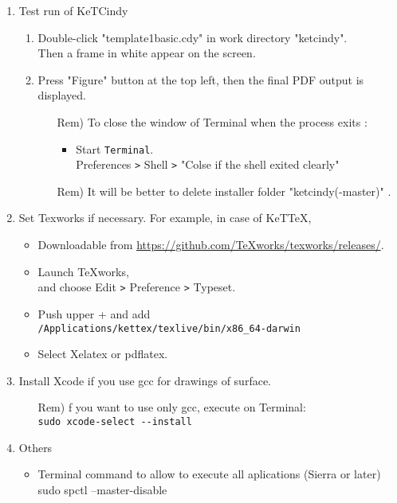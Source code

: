 \documentclass{article}
\begin{document}
\begin{enumerate}[\bf\large 1.]
\item Test run of KeTCindy
 \begin{enumerate}[(1)]
  \item Double-click "template1basic.cdy" in work directory "ketcindy".\\
  \hspace*{10mm}Then a frame in white appear on the screen.  
  \item Press "Figure" button at the top left, then the final PDF output is displayed. 
    \begin{itemize}
    \item[Rem)]To close the window of Terminal when the process exits :
      \begin{itemize}
      \item Start \verb|Terminal|.\\
      \hspace*{10mm}Preferences \verb|>| Shell \verb|>| "Colse if the shell exited clearly"
      \end{itemize}
    \item[Rem)]It will be better to delete installer folder "ketcindy(-master)" .
    \end{itemize} 
  \end{enumerate}
\item Set Texworks if necessary. For example, in case of KeTTeX,
  \begin{itemize}
  \item Downloadable from \url{https://github.com/TeXworks/texworks/releases/}.
  \item Launch TeXworks,\\
  \hspace*{10mm}and choose Edit \verb|>| Preference \verb|>| Typeset.
  \item Push upper + and add\\
  \hspace*{5mm}\verb|/Applications/kettex/texlive/bin/x86_64-darwin|
  \item Select Xelatex or pdflatex.
  \end{itemize}

\item Install Xcode if you use gcc for drawings of surface.
  \begin{itemize}
  \item[Rem)]f you want to use only gcc, execute on Terminal:\\
    \hspace*{10mm}\verb|sudo xcode-select --install|
  \end{itemize}

\item Others
 \begin{itemize}
  \item Terminal command to allow to execute all aplications (Sierra or later)\\
\hspace*{20mm}sudo spctl --master-disable
 \end{itemize}
\end{enumerate}
\end{document}
